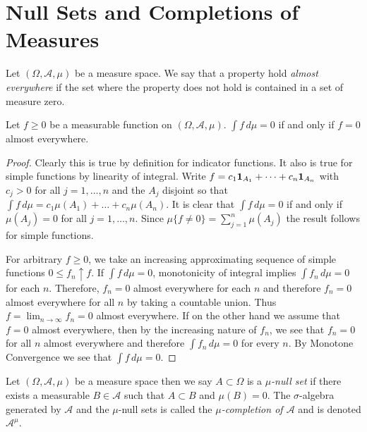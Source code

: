 \section{Null Sets and Completions of Measures}
\begin{defn}Let $(\Omega,  \mathcal{A}, \mu)$ be a measure space.  We
  say that a property hold \emph{almost everywhere} if the set where
  the property does not hold is contained in a set of measure zero.
\end{defn}
\begin{lem}\label{ZeroIntegralImpliesZeroFunction}Let $f \geq 0$ be a measurable function on $(\Omega,
  \mathcal{A}, \mu)$.  $\int f \, d\mu = 0$ if and only if $f = 0$
  almost everywhere.
\end{lem}
\begin{proof}Clearly this is true by definition for indicator
  functions.  It also is true for simple functions by linearity of integral.  Write $f = c_1 \textbf{1}_{A_1} + \dotsb + c_n \textbf{1}_{A_n}$ with $c_j > 0$ for all $j=1, \dotsc, n$ and the $A_j$ disjoint so that 
$\int f \, d\mu = c_1 \mu(A_1) + \dotsc + c_n \mu(A_n)$.  It is clear that $\int f \, d \mu = 0$ if and only if $\mu(A_j) = 0$ for all $j=1, \dotsc, n$.  Since $\mu \lbrace f \neq 0 \rbrace = \sum_{j=1}^n \mu(A_j)$ the result follows for simple functions.

For arbitrary $f\geq 0$, we take an
increasing  approximating sequence of simple functions $0 \leq f_n \uparrow
f$.  If $\int f \, d\mu = 0$, monotonicity of integral
implies $\int f_n \, d\mu = 0$ for each $n$.  Therefore, $f_n = 0$ almost
everywhere for each $n$ and therefore $f_n = 0$ almost everywhere for
all $n$ by taking a countable union.  Thus $f = \lim_{n \to \infty} f_n = 0$ almost
everywhere. 
If on the other hand we assume that $f = 0$ almost
everywhere, then by the increasing nature of $f_n$, we see that $f_n
=0$ for all $n$ almost everywhere and therefore $\int f_n \, d\mu = 0$
for every $n$.  By Monotone Convergence we see that $\int f \, d\mu = 0$.
\end{proof}
 
\begin{defn}Let $(\Omega, \mathcal{A}, \mu)$ be a measure space then we say $A \subset \Omega$ is a \emph{$\mu$-null set} if
there exists a measurable $B \in \mathcal{A}$ such that $A \subset B$ and $\mu(B) = 0$.  The $\sigma$-algebra generated by $\mathcal{A}$ and 
the $\mu$-null sets is called the \emph{$\mu$-completion of $\mathcal{A}$} and is denoted $\mathcal{A}^\mu$.  
\end{defn}

